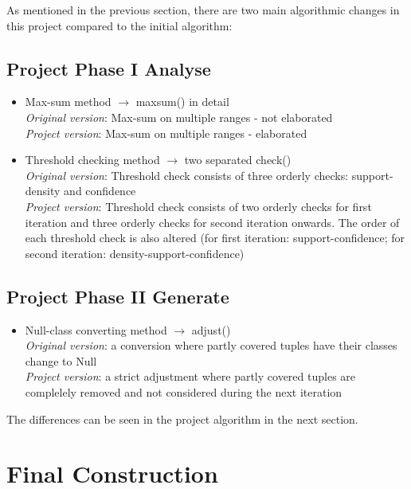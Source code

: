 As mentioned in the previous section, there are two main algorithmic changes in this project compared to the initial algorithm:

\subsection{Project Phase I Analyse} 

\begin{itemize}
	\item Max-sum method $\rightarrow$ maxsum() in detail \\
	\textit{Original version}: Max-sum on multiple ranges - not elaborated \\
	\textit{Project version}: Max-sum on multiple ranges - elaborated \\

	\item Threshold checking method $\rightarrow$ two separated check() \\
	\textit{Original version}: Threshold check consists of three orderly checks: support-density and confidence \\
	\textit{Project version}: Threshold check consists of two orderly checks for first iteration and three orderly checks for second iteration onwards. The order of each threshold check is also altered (for first iteration: support-confidence; for second iteration: density-support-confidence) \\
\end{itemize}

\subsection{Project Phase II Generate} 

\begin{itemize}
	\item Null-class converting method $\rightarrow$ adjust() \\
	\textit{Original version}: a conversion where partly covered tuples have their classes change to Null \\
	\textit{Project version}: a strict adjustment where partly covered tuples are complelely removed and not considered during the next iteration \\
\end{itemize}

The differences can be seen in the project algorithm in the next section.

\section{Final Construction}

